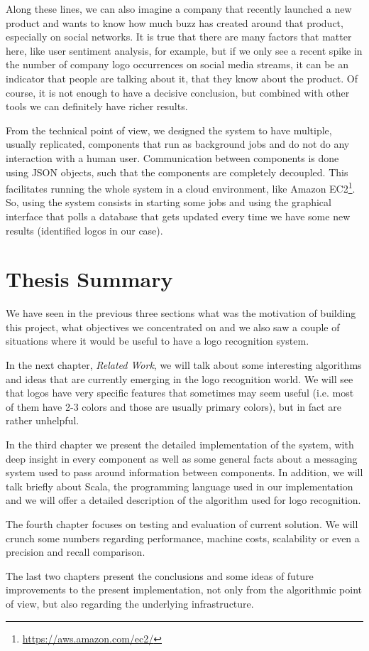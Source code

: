Along these lines, we can also imagine a company that recently launched a new
product and wants to know how much buzz has created around that product,
especially on social networks. It is true that there are many factors that
matter here, like user sentiment analysis, for example, but if we only see a
recent spike in the number of company logo occurrences on social media
streams, it can be an indicator that people are talking about it, that they
know about the product. Of course, it is not enough to have a decisive
conclusion, but combined with other tools we can definitely have richer
results.

From the technical point of view, we designed the system to have multiple,
usually replicated, components that run as background jobs and do not do any
interaction with a human user. Communication between components is done using
JSON objects, such that the components are completely decoupled. This
facilitates running the whole system in a cloud environment, like Amazon
EC2\footnote{\url{https://aws.amazon.com/ec2/}}. So, using the system consists
in starting some jobs and using the graphical interface that polls a database
that gets updated every time we have some new results (identified logos in our
case).

\section{Thesis Summary}

We have seen in the previous three sections what was the motivation of
building this project, what objectives we concentrated on and we also saw
a couple of situations where it would be useful to have a logo recognition
system.

In the next chapter, \textit{Related Work}, we will talk about some
interesting algorithms and ideas that are currently emerging in the logo
recognition world. We will see that logos have very specific features that
sometimes may seem useful (i.e. most of them have 2-3 colors and those are
usually primary colors), but in fact are rather unhelpful.

In the third chapter we present the detailed implementation of the system,
with deep insight in every component as well as some general facts about a
messaging system used to pass around information between components. In
addition, we will talk briefly about Scala, the programming language used in our
implementation and we will offer a detailed description of the algorithm used
for logo recognition.

The fourth chapter focuses on testing and evaluation of current solution. We
will crunch some numbers regarding performance, machine costs, scalability or
even a precision and recall comparison.

The last two chapters present the conclusions and some ideas of future improvements to the present
implementation, not only from the algorithmic point of view, but also
regarding the underlying infrastructure.
